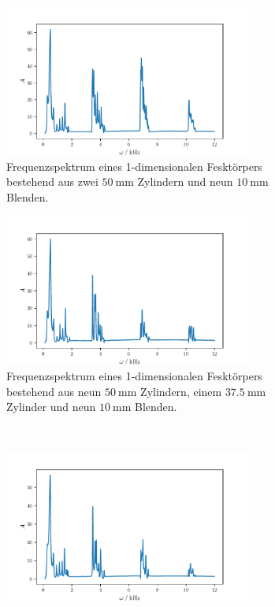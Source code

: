 \begin{figure}
    \begin{subfigure}{0.48\textwidth}%
        \centering%
        \includegraphics[height=5cm]{build/10c9b10.pdf}%
        \caption{Frequenzspektrum eines 1-dimensionalen Fesktörpers bestehend aus zwei $\qty{50}{\milli\meter}$ Zylindern und neun $\qty{10}{\milli\meter}$ Blenden.}%
        \label{fig:10c9b}%
    \end{subfigure}%
    \hfill%
    \begin{subfigure}{0.48\textwidth}%
        \centering%
        \includegraphics[height=5cm]{build/10c9b375.pdf}
        \caption{Frequenzspektrum eines 1-dimensionalen Fesktörpers bestehend aus neun $\qty{50}{\milli\meter}$ Zylindern, einem 
        $\qty{37.5}{\milli\meter}$ Zylinder und neun $\qty{10}{\milli\meter}$ Blenden.}%
        \label{fig:10c9b375}
    \end{subfigure} \\
    \begin{subfigure}{0.48\textwidth}%
        \centering%
        \includegraphics[height=5cm]{build/10c9b625.pdf}%

\end{subfigure}
\end{figure}

